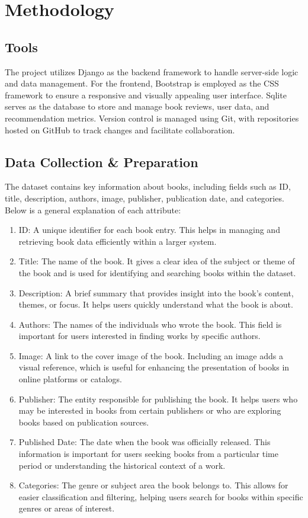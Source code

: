 \section{Methodology}
\subsection{Tools}
The project utilizes Django as the backend framework to handle server-side logic and data management. For the frontend, Bootstrap is employed as the CSS framework to ensure a responsive and visually appealing user interface. Sqlite serves as the database to store and manage book reviews, user data, and recommendation metrics. Version control is managed using Git, with repositories hosted on GitHub to track changes and facilitate collaboration.

\subsection{Data Collection \& Preparation} 
The dataset contains key information about books, including fields such as ID, title, description, authors, image, publisher, publication date, and categories. Below is a general explanation of each attribute:
\begin{enumerate}
	\item ID: A unique identifier for each book entry. This helps in managing and retrieving book data efficiently within a larger system.
	\item Title: The name of the book. It gives a clear idea of the subject or theme of the book and is used for identifying and searching books within the dataset.
	\item Description: A brief summary that provides insight into the book’s content, themes, or focus. It helps users quickly understand what the book is about.
	\item Authors: The names of the individuals who wrote the book. This field is important for users interested in finding works by specific authors.
	\item Image: A link to the cover image of the book. Including an image adds a visual reference, which is useful for enhancing the presentation of books in online platforms or catalogs.
	\item Publisher: The entity responsible for publishing the book. It helps users who may be interested in books from certain publishers or who are exploring books based on publication sources.
	\item Published Date: The date when the book was officially released. This information is important for users seeking books from a particular time period or understanding the historical context of a work.
	\item Categories: The genre or subject area the book belongs to. This allows for easier classification and filtering, helping users search for books within specific genres or areas of interest.
\end{enumerate}


